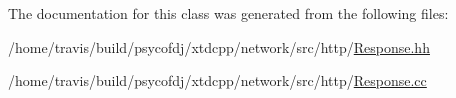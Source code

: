 The documentation for this class was generated from the following files\-:\begin{DoxyCompactItemize}
\item 
/home/travis/build/psycofdj/xtdcpp/network/src/http/\hyperlink{Response_8hh}{Response.\-hh}\item 
/home/travis/build/psycofdj/xtdcpp/network/src/http/\hyperlink{Response_8cc}{Response.\-cc}\end{DoxyCompactItemize}
